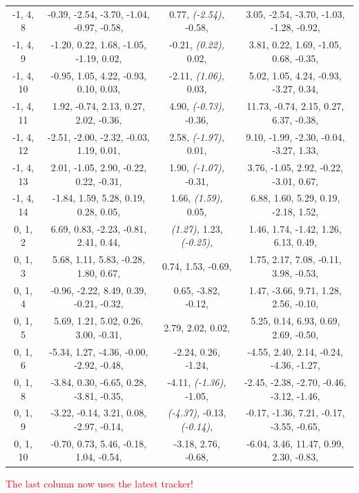 \documentclass[compress]{beamer}
\begin{document}
\begin{frame}
{\begin{tabular}{c c c c}
-1, 4, 8 &  -0.39,   -2.54,   -3.70,   -1.04,   -0.97,   -0.58,  &  0.77,   {\it (-2.54),}   -0.58,  &  3.05,   -2.54,   -3.70,   -1.03,   -1.28,   -0.92,  \\
-1, 4, 9 &  -1.20,   0.22,   1.68,   -1.05,   -1.19,   0.02,  &  -0.21,   {\it (0.22),}   0.02,  &  3.81,   0.22,   1.69,   -1.05,   0.68,   -0.35,  \\
-1, 4, 10 &  -0.95,   1.05,   4.22,   -0.93,   0.10,   0.03,  &  -2.11,   {\it (1.06),}   0.03,  &  5.02,   1.05,   4.24,   -0.93,   -3.27,   0.34,  \\
-1, 4, 11 &  1.92,   -0.74,   2.13,   0.27,   2.02,   -0.36,  &  4.90,   {\it (-0.73),}   -0.36,  &  11.73,   -0.74,   2.15,   0.27,   6.37,   -0.38,  \\
-1, 4, 12 &  -2.51,   -2.00,   -2.32,   -0.03,   1.19,   0.01,  &  2.58,   {\it (-1.97),}   0.01,  &  9.10,   -1.99,   -2.30,   -0.04,   -3.27,   1.33,  \\
-1, 4, 13 &  2.01,   -1.05,   2.90,   -0.22,   0.22,   -0.31,  &  1.90,   {\it (-1.07),}   -0.31,  &  3.76,   -1.05,   2.92,   -0.22,   -3.01,   0.67,  \\
-1, 4, 14 &  -1.84,   1.59,   5.28,   0.19,   0.28,   0.05,  &  1.66,   {\it (1.59),}   0.05,  &  6.88,   1.60,   5.29,   0.19,   -2.18,   1.52,  \\
0, 1, 2 &  6.69,   0.83,   -2.23,   -0.81,   2.41,   0.44,  &  {\it (1.27),}   1.23,   {\it (-0.25),}  &  1.46,   1.74,   -1.42,   1.26,   6.13,   0.49,  \\
0, 1, 3 &  5.68,   1.11,   5.83,   -0.28,   1.80,   0.67,  &  0.74,   1.53,   -0.69,  &  1.75,   2.17,   7.08,   -0.11,   3.98,   -0.53,  \\
0, 1, 4 &  -0.96,   -2.22,   8.49,   0.39,   -0.21,   -0.32,  &  0.65,   -3.82,   -0.12,  &  1.47,   -3.66,   9.71,   1.28,   2.56,   -0.10,  \\
0, 1, 5 &  5.69,   1.21,   5.02,   0.26,   3.00,   -0.31,  &  2.79,   2.02,   0.02,  &  5.25,   0.14,   6.93,   0.69,   2.69,   -0.50,  \\
0, 1, 6 &  -5.34,   1.27,   -4.36,   -0.00,   -2.92,   -0.48,  &  -2.24,   0.26,   -1.24,  &  -4.55,   2.40,   2.14,   -0.24,   -4.36,   -1.27,  \\
0, 1, 8 &  -3.84,   0.30,   -6.65,   0.28,   -3.81,   -0.35,  &  -4.11,   {\it (-1.36),}   -1.05,  &  -2.45,   -2.38,   -2.70,   -0.46,   -3.12,   -1.46,  \\
0, 1, 9 &  -3.22,   -0.14,   3.21,   0.08,   -2.97,   -0.14,  &  {\it (-4.37),}   -0.13,   {\it (-0.14),}  &  -0.17,   -1.36,   7.21,   -0.17,   -3.55,   -0.65,  \\
0, 1, 10 &  -0.70,   0.73,   5.46,   -0.18,   1.04,   -0.54,  &  -3.18,   2.76,   -0.68,  &  -6.04,   3.46,   11.47,   0.99,   2.30,   -0.83,  \\
\end{tabular}}

\vfill \tiny \textcolor{red}{The last column now uses the latest tracker!}
\end{frame}
\end{document}
